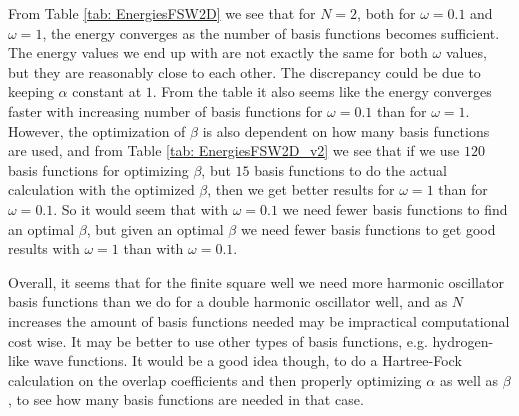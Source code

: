 \documentclass[../main.tex]{subfiles}
\begin{document}
From Table \ref{tab: EnergiesFSW2D} we see that for $N=2$, both for $\omega = 0.1$ and $\omega = 1$, the energy converges as the number of basis functions becomes sufficient. The energy values we end up with are not exactly the same for both $\omega$ values, but they are reasonably close to each other. The discrepancy could be due to keeping $\alpha$ constant at $1$. From the table it also seems like the energy converges faster with increasing number of basis functions for $\omega = 0.1$ than for $\omega = 1$. However, the optimization of $\beta$ is also dependent on how many basis functions are used, and from Table \ref{tab: EnergiesFSW2D_v2} we see that if we use $120$ basis functions for optimizing $\beta$, but $15$ basis functions to do the actual calculation with the optimized $\beta$, then we get better results for $\omega = 1$ than for $\omega = 0.1$. So it would seem that with $\omega = 0.1$ we need fewer basis functions to find an optimal $\beta$, but given an optimal $\beta$ we need fewer basis functions to get good results with $\omega = 1$ than with $\omega = 0.1$.

Overall, it seems that for the finite square well we need more harmonic oscillator basis functions than we do for a double harmonic oscillator well, and as $N$ increases the amount of basis functions needed may be impractical computational cost wise. It may be better to use other types of basis functions, e.g. hydrogen-like wave functions. It would be a good idea though, to do a Hartree-Fock calculation on the overlap coefficients and then properly optimizing $\alpha$ as well as $\beta$, to see how many basis functions are needed in that case.
\end{document}
